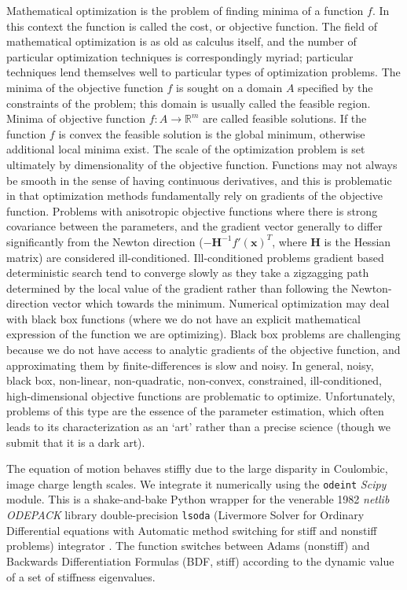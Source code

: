 \documentclass[12pt,a4paper,oneside]{book}
\begin{document}
Mathematical optimization is the problem of finding minima of a function $f$. In this context the function is called the cost, or objective function. The field of mathematical optimization is as old as calculus itself, and the number of particular optimization techniques is correspondingly myriad; particular techniques lend themselves well to particular types of optimization problems. The minima of the objective function $f$ is sought on a domain $A$ specified by the constraints of the problem; this domain is usually called the feasible region. Minima of objective function $f: A \rightarrow \mathbb{R}^m$ are called feasible solutions. If the function $f$ is convex the feasible solution is the global minimum, otherwise additional local minima exist. The scale of the optimization problem is set ultimately by dimensionality of the objective function. Functions may not always be smooth in the sense of having continuous derivatives, and this is problematic in that optimization methods fundamentally rely on gradients of the objective function. Problems with anisotropic objective functions where there is strong covariance between the parameters, and the gradient vector generally to differ significantly from the Newton direction ($-\mathbf{H}^{-1} f' ( \mathbf{x} )^T$, where $\mathbf{H}$ is the Hessian matrix) are considered ill-conditioned. Ill-conditioned problems gradient based deterministic search tend to converge slowly as they take a zigzagging path determined by the local value of the gradient rather than following the Newton-direction vector which towards the minimum. Numerical optimization may deal with black box functions (where we do not have an explicit mathematical expression of the function we are optimizing). Black box problems are challenging because we do not have access to analytic gradients of the objective function, and approximating them by finite-differences is slow and noisy. In general, noisy, black box, non-linear, non-quadratic, non-convex, constrained, ill-conditioned, high-dimensional objective functions are problematic to optimize. Unfortunately, problems of this type are the essence of the parameter estimation, which often leads to its characterization as an `art' rather than a precise science (though we submit that it is a dark art).   

The equation of motion behaves stiffly due to the large disparity in Coulombic, image charge length scales. We integrate it numerically using the \verb|odeint| \emph{Scipy} module. This is a shake-and-bake Python wrapper for the venerable 1982 \emph{netlib ODEPACK} library double-precision \verb|lsoda| (Livermore Solver for Ordinary Differential equations with Automatic method switching for stiff and nonstiff problems) integrator \cite{hindmarsh_odepack_1983}. The function switches between Adams (nonstiff) and Backwards Differentiation Formulas (BDF, stiff) according to the dynamic value of a set of stiffness eigenvalues.
\end{document}

